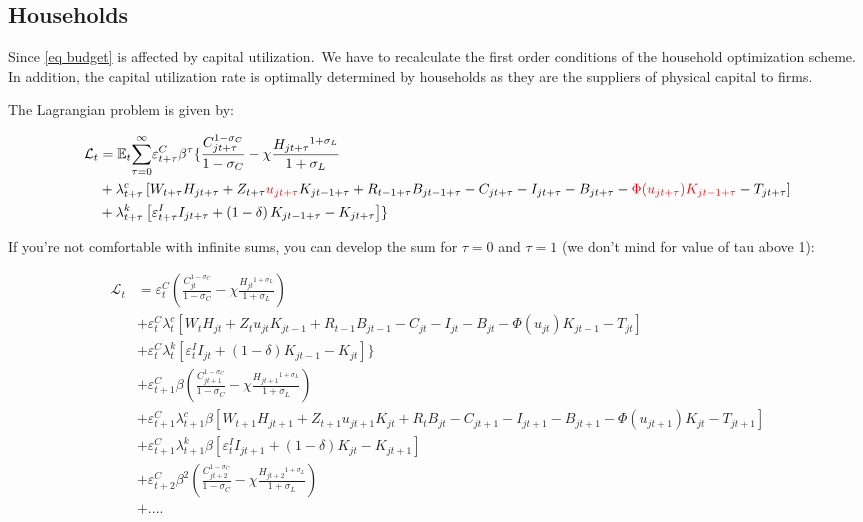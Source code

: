 \documentclass{article}%
\begin{document}
\subsection{Households}

Since \autoref{eq budget} is affected by capital utilization.\ We have to
recalculate the first order conditions of the household optimization scheme.
In addition, the capital utilization rate is optimally determined by
households as they are the suppliers of physical capital to firms.\ 

The Lagrangian problem is given by:%

\begin{align*}
\mathcal{L}_{t}  &  =\mathbb{E}_{t}%
{\displaystyle\sum\limits_{\tau=0}^{\infty}}
\varepsilon_{t+\tau}^{C}\beta^{\tau}\{\frac{C_{jt+\tau}^{1-\sigma_{C}}%
}{1-\sigma_{C}}-\chi\frac{H_{jt+\tau}{}^{1+\sigma_{L}}}{1+\sigma_{L}}\\
&  +\lambda_{t+\tau}^{c}\left[  W_{t+\tau}H_{jt+\tau}+Z_{t+\tau}%
\textcolor{red}{u_{jt+\tau}}K_{jt-1+\tau}+R_{t-1+\tau}B_{jt-1+\tau}%
-C_{jt+\tau}-I_{jt+\tau}-B_{jt+\tau}%
-\textcolor{red}{\Phi(u_{jt+\tau})K_{jt-1+\tau}}-T_{jt+\tau}\right] \\
&  +\lambda_{t+\tau}^{k}\left[  \varepsilon_{t+\tau}^{I}I_{jt+\tau}+\left(
1-\delta\right)  K_{jt-1+\tau}-K_{jt+\tau}\right]  \}
\end{align*}


If you're not comfortable with infinite sums, you can develop the sum for
$\tau=0$ and $\tau=1$ (we don't mind for value of tau above 1):%

\begin{align*}
\mathcal{L}_{t}  &  =\varepsilon_{t}^{C}\left(  \frac{C_{jt}^{1-\sigma_{C}}%
}{1-\sigma_{C}}-\chi\frac{H_{jt}{}^{1+\sigma_{L}}}{1+\sigma_{L}}\right) \\
&  +\varepsilon_{t}^{C}\lambda_{t}^{c}\left[  W_{t}H_{jt}+Z_{t}u_{jt}%
K_{jt-1}+R_{t-1}B_{jt-1}-C_{jt}-I_{jt}-B_{jt}-\Phi\left(  u_{jt}\right)
K_{jt-1}-T_{jt}\right] \\
&  +\varepsilon_{t}^{C}\lambda_{t}^{k}\left[  \varepsilon_{t}^{I}%
I_{jt}+\left(  1-\delta\right)  K_{jt-1}-K_{jt}\right]  \}\\
&  +\varepsilon_{t+1}^{C}\beta\left(  \frac{C_{jt+1}^{1-\sigma_{C}}}%
{1-\sigma_{C}}-\chi\frac{H_{jt+1}{}^{1+\sigma_{L}}}{1+\sigma_{L}}\right) \\
&  +\varepsilon_{t+1}^{C}\lambda_{t+1}^{c}\beta\left[  W_{t+1}H_{jt+1}%
+Z_{t+1}u_{jt+1}K_{jt}+R_{t}B_{jt}-C_{jt+1}-I_{jt+1}-B_{jt+1}-\Phi\left(
u_{jt+1}\right)  K_{jt}-T_{jt+1}\right] \\
&  +\varepsilon_{t+1}^{C}\lambda_{t+1}^{k}\beta\left[  \varepsilon_{t}%
^{I}I_{jt+1}+\left(  1-\delta\right)  K_{jt}-K_{jt+1}\right] \\
&  +\varepsilon_{t+2}^{C}\beta^{2}\left(  \frac{C_{jt+2}^{1-\sigma_{C}}%
}{1-\sigma_{C}}-\chi\frac{H_{jt+2}{}^{1+\sigma_{L}}}{1+\sigma_{L}}\right) \\
&  +....
\end{align*}
\end{document}
